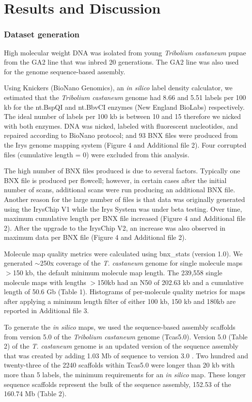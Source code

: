 \documentclass{bmcart}
\begin{document}
\section*{Results and Discussion}

\subsubsection*{Dataset generation}
High molecular weight DNA was isolated from young \textit{Tribolium castaneum} pupae from the GA2 line that was inbred 20 generations. The GA2 line was also used for the genome sequence-based assembly.

Using Knickers (BioNano Genomics), an \textit{in silico} label density calculator, we estimated that the \textit{Tribolium castaneum} genome had 8.66 and 5.51 labels per 100 kb for the nt.BspQI and nt.BbvCI enzymes (New England BioLabs) respectively. The ideal number of labels per 100 kb is between 10 and 15 therefore we nicked with both enzymes. DNA was nicked, labeled with fluorescent nucleotides, and repaired according to BioNano protocol; and 93 BNX files were produced from the Irys genome mapping system (Figure 4 and Additional file 2). Four corrupted files (cumulative length = 0) were excluded from this analysis. 

The high number of BNX files produced is due to several factors. Typically one BNX file is produced per flowcell; however, in certain cases after the initial number of scans, additional scans were run producing an additional BNX file. Another reason for the large number of files is that data was originally generated using the IrysChip\textregistered\textnormal{ }V1 while the Irys System was under beta testing. Over time, maximum cumulative length per BNX file increased (Figure 4 and Additional file 2). After the upgrade to the IrysChip V2, an increase was also observed in maximum data per BNX file (Figure 4 and Additional file 2).

Molecule map quality metrics were calculated using bnx\_stats (version 1.0). We generated $\sim$250x coverage of the \textit{T. castaneum} genome for single molecule maps $>$150 kb, the default minimum molecule map length. The 239,558 single molecule maps with lengths $>$150kb had an N50 of 202.63 kb and a cumulative length of 50.6 Gb (Table 1). Histograms of per-molecule quality metrics for maps after applying a minimum length filter of either 100 kb, 150 kb and 180kb are reported in Additional file 3. 

To generate the \textit{in silico} maps, we used the sequence-based assembly scaffolds from version 5.0 of the \textit{Tribolium castaneum} genome (Tcas5.0). Version 5.0 (Table 2) of the \textit{T. castaneum} genome is an updated version of the sequence assembly that was created by adding 1.03 Mb of sequence to version 3.0 \cite{Beetle2008}. Two hundred and twenty-three of the 2240 scaffolds within Tcas5.0 were longer than 20 kb with more than 5 labels, the minimum requirements for an \textit{in silico}  map. These longer sequence scaffolds represent the bulk of the sequence assembly, 152.53 of the 160.74 Mb (Table 2).
\end{document}
